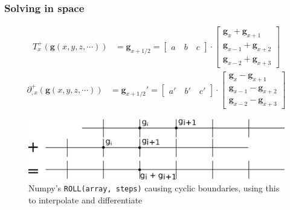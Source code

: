\documentclass{beamer}
\begin{document}
\begin{frame}[shrink=20]

\frametitle{Solving in space}

\begin{align}
    T^+_x(\mathbf{g}(x, y, z, \cdots)) &=  \mathbf{g}_{x+1/2} = 
    \begin{bmatrix}
        a \quad b \quad c
    \end{bmatrix}
    \cdot
    \begin{bmatrix}
        \mathbf{g}_x + \mathbf{g}_{x+1} \\
        \mathbf{g}_{x-1} + \mathbf{g}_{x+2} \\
        \mathbf{g}_{x-2} + \mathbf{g}_{x+3}
    \end{bmatrix}
\end{align}
\begin{align}
    \partial^+_{,x}(\mathbf{g}(x, y, z, \cdots)) &=  \mathbf{g}_{x+1/2}' = 
    \begin{bmatrix}
        a' \quad b' \quad c'
    \end{bmatrix}
    \cdot
    \begin{bmatrix}
        \mathbf{g}_x - \mathbf{g}_{x+1} \\
        \mathbf{g}_{x-1} - \mathbf{g}_{x+2} \\
        \mathbf{g}_{x-2} - \mathbf{g}_{x+3}
    \end{bmatrix}
    \label{eq:deriv}
\end{align}

\begin{figure}[htpb]
    \centering
    \includegraphics[width=\columnwidth]{roll.eps}
    \caption{Numpy's \texttt{ROLL(array, steps)} causing cyclic boundaries, using this to interpolate and differentiate}
    \label{fig:roll}
\end{figure}

\end{frame}
\end{document}

